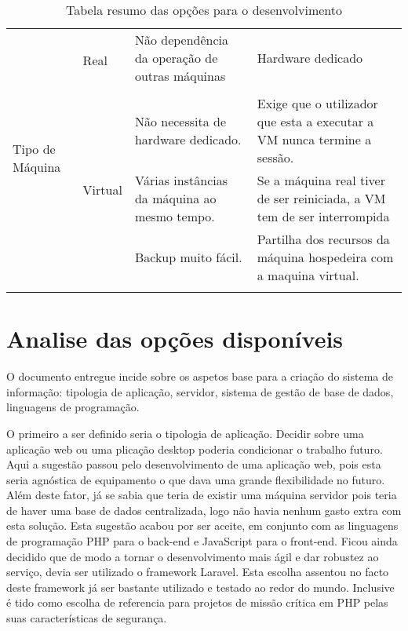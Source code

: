 \begin{longtable}{|p{}|p{}|p{}|p{}|}
	\multirow{5}{*}{Tipo de Máquina}                                        & \multirow{2}{*}{Real}                                 & Não dependência da operação de outras máquinas                      & Hardware dedicado                                                                                   \\
	&                                                       &                                                                     &                                                                                                     \\ \cline{2-4}
	& \multirow{3}{*}{Virtual}                              & Não necessita de hardware dedicado.                                 & Exige que o utilizador que esta a executar a VM nunca termine a sessão.                             \\
	&                                                       & Várias instâncias da máquina ao mesmo tempo.                        & Se a máquina real tiver de ser reiniciada, a VM tem de ser interrompida                             \\
	&                                                       & Backup muito fácil.                                                 & Partilha dos recursos da máquina hospedeira com a maquina virtual.                                  \\
	\hline
	\caption{Tabela resumo das opções para o desenvolvimento}
	\label{tab:opcoes_dev}
\end{longtable}



\section{Analise das opções disponíveis}
O documento entregue incide sobre os aspetos base para a criação do sistema de informação: tipologia de aplicação, servidor, sistema de gestão de base de dados, linguagens de programação.

O primeiro a ser definido seria o tipologia de aplicação. Decidir sobre uma aplicação web ou uma plicação desktop poderia condicionar o trabalho futuro. Aqui a sugestão passou pelo desenvolvimento de uma aplicação web, pois esta seria agnóstica de equipamento o que dava uma grande flexibilidade no futuro. Além deste fator, já se sabia que teria de existir uma máquina servidor pois teria de haver uma base de dados centralizada, logo não havia nenhum gasto extra com esta solução. Esta sugestão acabou por ser aceite, em conjunto com as linguagens de programação PHP para o back-end e JavaScript para o front-end. Ficou ainda decidido que de modo a tornar o desenvolvimento mais ágil e dar robustez ao serviço, devia ser utilizado o framework Laravel. Esta escolha assentou no facto deste framework já ser bastante utilizado e testado ao redor do mundo. Inclusive é tido como escolha de referencia para projetos de missão crítica em PHP pelas suas características de segurança\cite{Mansuri2018}.

